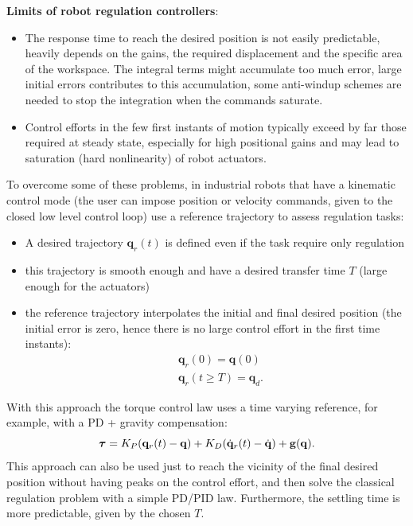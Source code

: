\documentclass[10pt, a4paper]{report}
\newcommand{\q}{{\mathbf q}}
\begin{document}
\noindent\textbf{Limits of robot regulation controllers}:\begin{itemize}
    \item The response time to reach the desired position is not easily predictable, heavily depends on the gains, the required displacement and the specific area of the workspace. The integral terms might accumulate too much error, large initial errors contributes to this accumulation, some anti-windup schemes are needed to stop the integration when the commands saturate.
    \item Control efforts in the few first instants of motion typically exceed by far
those required at steady state, especially for high positional gains and may lead to saturation (hard nonlinearity) of robot actuators.
\end{itemize}
To overcome some of these problems, in industrial robots that have a kinematic control mode (the user can impose position or velocity commands, given to the closed low level control loop) use a reference trajectory to assess regulation tasks:\begin{itemize}
    \item A desired trajectory $\q_r(t)$ is defined even if the task require only regulation 
    \item this trajectory is smooth enough and have a desired transfer time $T$ (large enough for the actuators)
    \item the reference trajectory interpolates the initial and final desired position (the initial error is zero, hence there is no large control effort in the first time instants):\begin{align}
        &\q_r(0)=\q(0)\\
        &\q_r(t\ge T)=\q_d.
    \end{align}
\end{itemize}
With this approach the torque control law uses a time varying reference, for example, with a PD + gravity compensation:\begin{equation}
    \btau=K_P(\q_r(t)-\q)+K_D(\dq_r(t)-\dq)+\mathbf g(\q).
\end{equation}
This approach can also be used just to reach the vicinity of the final desired position without having peaks on the control effort, and then solve the classical regulation problem with a simple PD/PID law. Furthermore, the settling time is more predictable, given by the chosen $T$.
\end{document}
